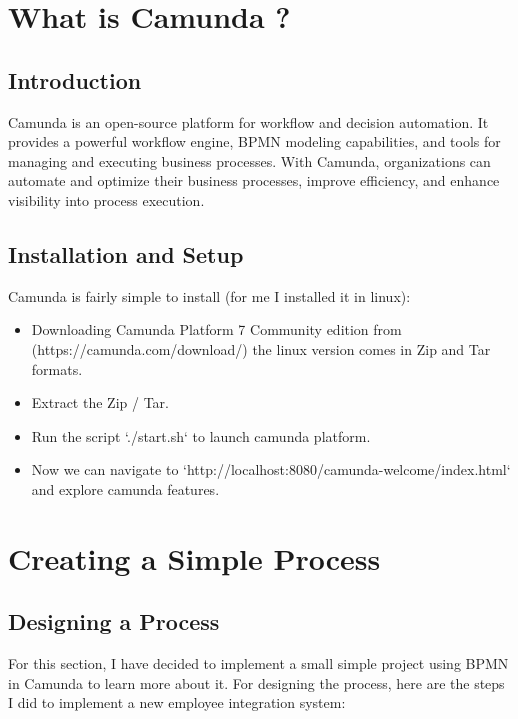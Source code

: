 \documentclass[12pt]{article}
\begin{document}
{\section{What is Camunda ?}

  \subsection{Introduction}

Camunda is an open-source platform for workflow and decision automation. It provides a powerful workflow engine, BPMN modeling capabilities, and tools for managing and executing business processes. With Camunda, organizations can automate and optimize their business processes, improve efficiency, and enhance visibility into process execution.

  \subsection{Installation and Setup}

Camunda is fairly simple to install (for me I installed it in linux):

  \begin{itemize}
    \item Downloading Camunda Platform 7 Community edition from (https://camunda.com/download/) the linux version comes in Zip and Tar formats.
    \item Extract the Zip / Tar.
    \item Run the script `./start.sh` to launch camunda platform.
    \item Now we can navigate to `http://localhost:8080/camunda-welcome/index.html` and explore camunda features.
  \end{itemize}

\pagebreak

\section{Creating a Simple Process}

  \subsection{Designing a Process}
  
For this section, I have decided to implement a small simple project using BPMN in Camunda to learn more about it.
For designing the process, here are the steps I did to implement a new employee integration system:

}
\end{document}
